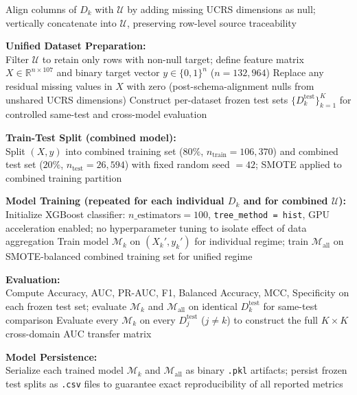 \documentclass[onecolumn]{IEEEtai}
\begin{document}
\begin{algorithm}[H]
{    Align columns of $D_k$ with $\mathcal{U}$ by adding missing UCRS dimensions as null; vertically concatenate into $\mathcal{U}$, preserving row-level source traceability\;
}

\textbf{Unified Dataset Preparation:}\\
Filter $\mathcal{U}$ to retain only rows with non-null target; define feature matrix $X \in \mathbb{R}^{n \times 107}$ and binary target vector $y \in \{0,1\}^n$ ($n = 132{,}964$)\;
Replace any residual missing values in $X$ with zero (post-schema-alignment nulls from unshared UCRS dimensions)\;
Construct per-dataset frozen test sets $\{D_k^{\text{test}}\}_{k=1}^{K}$ for controlled same-test and cross-model evaluation\;

\textbf{Train-Test Split (combined model):}\\
Split $(X, y)$ into combined training set ($80\%$, $n_{\text{train}} = 106{,}370$) and combined test set ($20\%$, $n_{\text{test}} = 26{,}594$) with fixed random seed $= 42$; SMOTE applied to combined training partition\;

\textbf{Model Training (repeated for each individual $D_k$ and for combined $\mathcal{U}$):}\\
Initialize XGBoost classifier: $n\_\text{estimators} = 100$, \texttt{tree\_method = hist}, GPU acceleration enabled; no hyperparameter tuning to isolate effect of data aggregation\;
Train model $\mathcal{M}_k$ on $(X_k', y_k')$ for individual regime; train $\mathcal{M}_{\text{all}}$ on SMOTE-balanced combined training set for unified regime\;

\textbf{Evaluation:}\\
Compute Accuracy, AUC, PR-AUC, F1, Balanced Accuracy, MCC, Specificity on each frozen test set; evaluate $\mathcal{M}_k$ and $\mathcal{M}_{\text{all}}$ on identical $D_k^{\text{test}}$ for same-test comparison\;
Evaluate every $\mathcal{M}_k$ on every $D_j^{\text{test}}$ ($j \neq k$) to construct the full $K \times K$ cross-domain AUC transfer matrix\;

\textbf{Model Persistence:}\\
Serialize each trained model $\mathcal{M}_k$ and $\mathcal{M}_{\text{all}}$ as binary \texttt{.pkl} artifacts; persist frozen test splits as \texttt{.csv} files to guarantee exact reproducibility of all reported metrics\;

\end{algorithm}
\vspace{-8pt}
\end{document}

